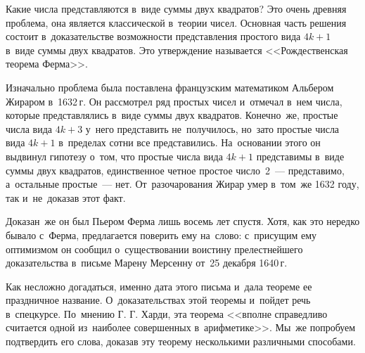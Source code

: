



Какие числа представляются в~виде суммы двух квадратов?
Это очень древняя проблема, она является классической в~теории чисел.
Основная часть решения состоит в~доказательстве возможности представления
простого вида $4 k + 1$ в~виде суммы двух квадратов.
Это утверждение называется <<Рождественская теорема Ферма>>.

Изначально проблема была поставлена французским математиком Альбером Жираром
в~1632\,г.
Он рассмотрел ряд простых чисел и~отмечал в~нем числа, которые представлялись
в~виде суммы двух квадратов.
Конечно~же, простые числа вида $4 k + 3$ у~него представить не~получилось,
но~зато простые числа вида $4 k + 1$ в~пределах сотни все представились.
На~основании этого он выдвинул гипотезу о~том, что простые числа вида $4 k + 1$
представимы в~виде суммы двух квадратов, единственное четное простое
число~2~--- представимо, а~остальные простые~--- нет.
От~разочарования Жирар умер в~том~же 1632 году, так и~не~доказав этот факт.

Доказан~же он был Пьером Ферма лишь восемь лет спустя.
Хотя, как это нередко бывало с~Ферма, предлагается поверить ему на~слово:
с~присущим ему оптимизмом он сообщил о~существовании воистину прелестнейшего
доказательства в~письме Марену Мерсенну от~25 декабря 1640\,г.

Как несложно догадаться, именно дата этого письма и~дала теореме ее праздничное
название.
О~доказательствах этой теоремы и~пойдет речь в~спецкурсе.
По~мнению Г. Г. Харди, эта теорема
<<вполне справедливо считается одной из~наиболее совершенных в~арифметике>>.
Мы~же попробуем подтвердить его слова, доказав эту теорему несколькими
различными способами.

